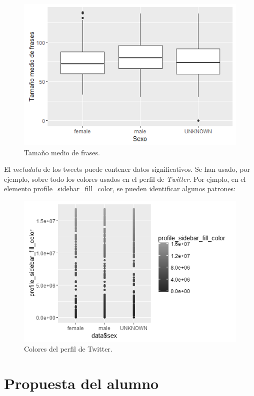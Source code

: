 \documentclass[11pt,a4paper]{article}
\begin{document}
  \begin{figure}[ht!]
    \includegraphics[width=\linewidth]{sentence_mean.png}
    \caption{Tama\~no medio de frases.}
    \label{fig:sentence_mean}
  \end{figure}
  
  El {\em metadata} de los tweets puede contener datos significativos. Se han usado, por ejemplo, sobre todo los colores usados en el perfil de {\em Twitter}. Por ejmplo, en el elemento {\ttfamily profile\_sidebar\_fill\_color}, se pueden identificar algunos patrones:
   
  \begin{figure}[ht!]
    \includegraphics[width=\linewidth]{profile_colors.png}
    \caption{Colores del perfil de Twitter.}
    \label{fig:profile_colors}
  \end{figure}
  

\section{Propuesta del alumno}
\end{document}
